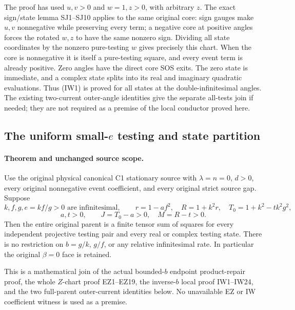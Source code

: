 The proof has used $u,v>0$ and $w=1,z>0$, with arbitrary $z$.
The exact sign/state lemma SJ1--SJ10 applies to the same original
core: sign gauges make $u,v$ nonnegative while preserving every
term; a negative core at positive angles forces the rotated
$w,z$ to have the same nonzero sign. Dividing all state coordinates
by the nonzero pure-testing $w$ gives precisely this chart.
When the core is nonnegative it is itself a pure-testing square,
and every event term is already positive. Zero angles have the
direct core SOS exits. The zero state is immediate, and a complex
state splits into its real and imaginary quadratic evaluations.
Thus (IW1) is proved for all states at the double-infinitesimal
angles. The existing two-current outer-angle identities give the
separate all-tests join if needed; they are not required as a premise
of the local conductor proved here.



\subsection{The uniform small-$e$ testing and state partition}

\label{component:p845b3cb8b114}

\label{p845b3cb8b114:sec:uniform-c1-complete-current-join}

\paragraph{Theorem and unchanged source scope.}
Use the original physical canonical C1 stationary source with
$\lambda=n=0$, $d>0$, every original nonnegative event coefficient,
and every original strict source gap. Suppose
\[
 k,f,g,e=kf/g>0\text{ are infinitesimal},\qquad
 r=1-af^2,\quad R=1+k^2r,\quad T_0=1+k^2-tk^2g^2,
\]
\[
                         a,t>0,\qquad J=T_0-a>0,\quad M=R-t>0.
                                                               \tag{UJ1}
\]
Then the entire original parent is a finite tensor sum of squares
for every independent projective testing pair and every real or
complex testing state. There is no restriction on $b=g/k$, $g/f$,
or any relative infinitesimal rate. In particular the original
$\beta=0$ face is retained.

This is a mathematical join of the actual bounded-$b$ endpoint
product-repair proof, the whole $Z$-chart proof EZ1--EZ19,
the inverse-$b$ local proof IW1--IW24, and the two full-parent
outer-current identities below. No unavailable EZ or IW
coefficient witness is used as a premise.


